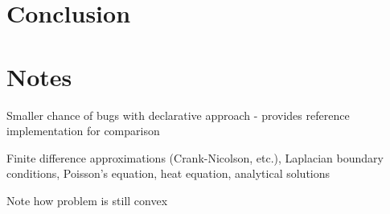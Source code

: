 \documentclass[conference]{IEEEtran}
\begin{document}
\section{Conclusion}


\section*{Notes}


Smaller chance of bugs with declarative approach - provides reference implementation for comparison

Finite difference approximations (Crank-Nicolson, etc.), Laplacian boundary conditions, Poisson's equation, heat equation, analytical solutions

Note how problem is still convex \cite{dummy}





\end{document}
